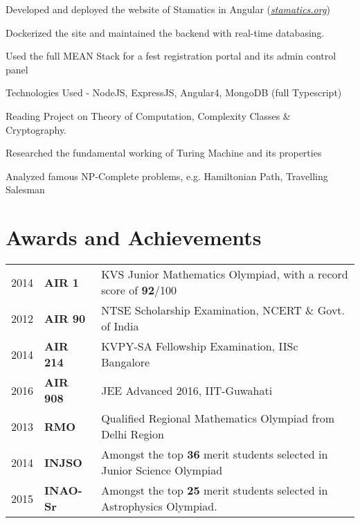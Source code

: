 \documentclass[]{deedy-resume-openfont}
\begin{document}
\begin{minipage}[t]{0.70\textwidth}
\vspace{0.1cm}
\begin{tightemize}
  \item Developed and deployed the website of Stamatics in Angular (\href{http://stamatics.org}{\textit{stamatics.org}})
  \item Dockerized the site and maintained the backend with real-time databasing.
\end{tightemize}
\begin{tightemize}
  \item Used the full MEAN Stack for a fest registration portal and its admin control panel
  \item Technologies Used - NodeJS, ExpressJS, Angular4, MongoDB (full Typescript)
\end{tightemize}

\vspace{0.1cm}
\begin{tightemize}
  \item Reading Project on Theory of Computation, Complexity Classes \& Cryptography.
  \item Researched the fundamental working of Turing Machine and its properties
  \item Analyzed famous NP-Complete problems, e.g. Hamiltonian Path, Travelling Salesman
\end{tightemize}


\section{Awards and Achievements} 
\begin{tabular}{rll}
  2014	   & \textbf{AIR 1}  & KVS Junior Mathematics Olympiad, with a record score of \textbf{92}/100 \\
  2012	   & \textbf{AIR 90} & NTSE Scholarship Examination, NCERT \& Govt. of India \\
  2014	   & \textbf{AIR 214}& KVPY-SA Fellowship Examination, IISc Bangalore \\
  2016     & \textbf{AIR 908}& JEE Advanced 2016, IIT-Guwahati \\
  2013	    & \textbf{RMO}     & Qualified Regional Mathematics Olympiad from Delhi Region \\
  2014	    & \textbf{INJSO}   & Amongst the top \textbf{36} merit students selected in Junior Science Olympiad   \\
  2015      & \textbf{INAO-Sr} & Amongst the top \textbf{25} merit students selected in Astrophysics Olympiad.
\end{tabular}


\end{minipage}
\end{document}
